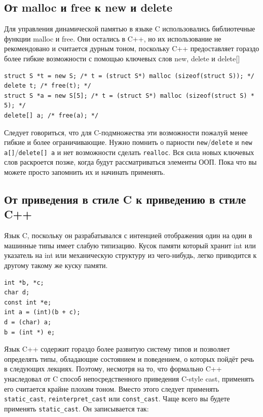 \documentclass[a4paper,12pt,oneside]{article}
\begin{document}
\subsection{От malloc и free к new и delete}

Для управления динамической памятью в языке C использовались библиотечные функции malloc и free. Они остались в C++, но их использование не рекомендовано и считается дурным тоном, поскольку C++ предоставляет гораздо более гибкие возможности с помощью ключевых слов new, delete и delete[]

\begin{lstlisting}
struct S *t = new S; /* t = (struct S*) malloc (sizeof(struct S)); */
delete t; /* free(t); */
struct S *a = new S[5]; /* t = (struct S*) malloc (sizeof(struct S) * 5); */
delete[] a; /* free(a); */
\end{lstlisting}

Следует говориться, что для C-подмножества эти возможности пожалуй менее гибкие и более ограничивающие. Нужно помнить о парности \lstinline!new!/\lstinline!delete! и \lstinline!new a[]!/\lstinline!delete[] a! и нет возможности сделать \lstinline!realloc!. Вся сила новых ключевых слов раскроется позже, когда будут рассматриваться элементы ООП. Пока что вы можете просто запомнить их и начинать применять.

\subsection{От приведения в стиле C к приведению в стиле C++}

Язык C, поскольку он разрабатывался с интенцией отображения один на один в машинные типы имеет слабую типизацию. Кусок памяти который хранит int или указатель на int или механическую структуру из чего-нибудь, легко приводится к другому такому же куску памяти.

\begin{lstlisting}
int *b, *c;
char d;
const int *e;
int a = (int)(b + c);
d = (char) a;
b = (int *) e;
\end{lstlisting}

Язык C++ содержит гораздо более развитую систему типов и позволяет определять типы, обладающие состоянием и поведением, о которых пойдёт речь в следующих лекциях. Поэтому, несмотря на то, что формально C++ унаследовал от C способ непосредственного приведения C-style cast, применять его считается крайне плохим тоном. Вместо этого следует применять \lstinline!static_cast!, \lstinline!reinterpret_cast! или \lstinline!const_cast!. Чаще всего вы будете применять \lstinline!static_cast!. Он записывается так:
\end{document}
